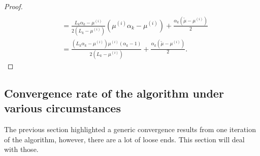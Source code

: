 \documentclass[12pt]{article}
\begin{document}
\begin{proof}
{\begin{align*}
                \\
                &= \frac{L_k \alpha_k - \mu^{(i)}}{2(L_k - \mu^{(i)})}\left(
                    \mu^{(i)}\alpha_k - \mu^{(i)} 
                \right)
                + \frac{\alpha_k(\tilde \mu - \mu^{(i)})}{2}
                \\
                &= 
                \frac{
                    \left(L_k \alpha_k - \mu^{(i)}\right)\mu^{(i)}
                    \left(\alpha_k - 1\right)
                }
                {2(L_k - \mu^{(i)})}
                + \frac{\alpha_k(\tilde \mu - \mu^{(i)})}{2}. 
            \end{align*}   
            } 
        \end{proof}
    \subsection{Convergence rate of the algorithm under various circumstances}
        The previous section highlighted a generic convergence results from one iteration of the algorithm, however, there are a lot of loose ends. 
        This section will deal with those. 
\end{document}
